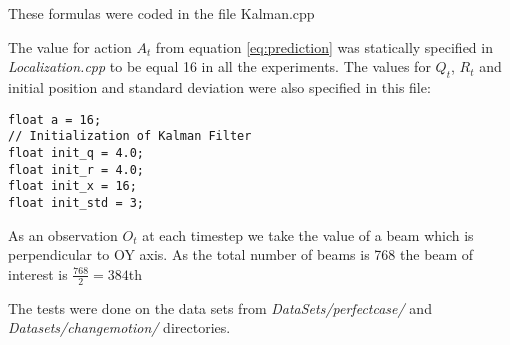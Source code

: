 \documentclass{article}
\begin{document}
These formulas were coded in the file Kalman.cpp

The value for action $A_t$ from equation \ref{eq:prediction} was statically
specified in \emph{Localization.cpp} to be equal 16 in all the
experiments. The values for $Q_t$, $R_t$ and initial position and
standard deviation were also specified in this file:

\begin{lstlisting}
float a = 16;
// Initialization of Kalman Filter
float init_q = 4.0;
float init_r = 4.0;
float init_x = 16;
float init_std = 3;
\end{lstlisting}

As an observation $O_t$ at each timestep we take the value of a beam
which is perpendicular to OY axis. As the total number of beams is 768
the beam of interest is $\frac{768}{2}=384$th

The tests were done on the data sets from \emph{DataSets/perfectcase/}
and\\
\emph{Datasets/changemotion/} directories.
\end{document}
